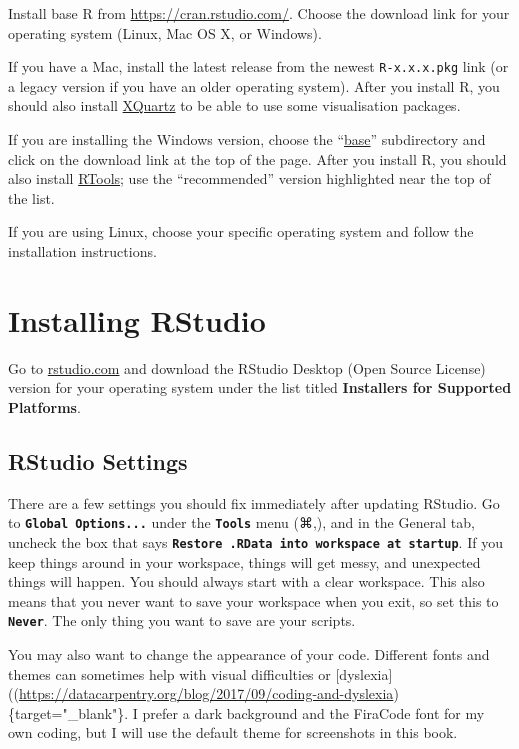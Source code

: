\documentclass[
  oneside]{book}
\begin{document}
Install base R from \url{https://cran.rstudio.com/}. Choose the download link for your operating system (Linux, Mac OS X, or Windows).

If you have a Mac, install the latest release from the newest \texttt{R-x.x.x.pkg} link (or a legacy version if you have an older operating system). After you install R, you should also install \href{http://xquartz.macosforge.org/}{XQuartz} to be able to use some visualisation packages.

If you are installing the Windows version, choose the ``\href{https://cran.rstudio.com/bin/windows/base/}{base}'' subdirectory and click on the download link at the top of the page. After you install R, you should also install \href{https://cran.rstudio.com/bin/windows/Rtools/}{RTools}; use the ``recommended'' version highlighted near the top of the list.

If you are using Linux, choose your specific operating system and follow the installation instructions.

\hypertarget{installing-rstudio}{%
\section{Installing RStudio}\label{installing-rstudio}}

Go to \href{https://www.rstudio.com/products/rstudio/download/\#download}{rstudio.com} and download the RStudio Desktop (Open Source License) version for your operating system under the list titled \textbf{Installers for Supported Platforms}.

\hypertarget{rstudio-settings}{%
\subsection{RStudio Settings}\label{rstudio-settings}}

There are a few settings you should fix immediately after updating RStudio. Go to \textbf{\texttt{Global\ Options...}} under the \textbf{\texttt{Tools}} menu (⌘,), and in the General tab, uncheck the box that says \textbf{\texttt{Restore\ .RData\ into\ workspace\ at\ startup}}. If you keep things around in your workspace, things will get messy, and unexpected things will happen. You should always start with a clear workspace. This also means that you never want to save your workspace when you exit, so set this to \textbf{\texttt{Never}}. The only thing you want to save are your scripts.

You may also want to change the appearance of your code. Different fonts and themes can sometimes help with visual difficulties or {[}dyslexia{]}((\url{https://datacarpentry.org/blog/2017/09/coding-and-dyslexia})\{target="\_blank"\}. I prefer a dark background and the FiraCode font for my own coding, but I will use the default theme for screenshots in this book.
\end{document}
